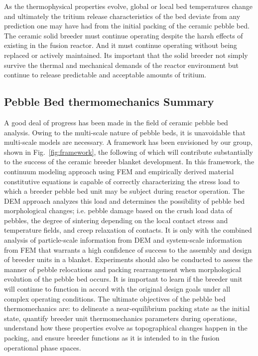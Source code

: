 As the thermophysical properties evolve, global or local bed temperatures change and ultimately the tritium release characteristics of the bed deviate from any prediction one may have had from the initial packing of the ceramic pebble bed. The ceramic solid breeder must continue operating despite the harsh effects of existing in the fusion reactor. And it must continue operating without being replaced or actively maintained. Its important that the solid breeder not simply survive the thermal and mechanical demands of the reactor environment but continue to release predictable and acceptable amounts of tritium. 

\subsection{Pebble Bed thermomechanics Summary}
A good deal of progress has been made in the field of ceramic pebble bed analysis. Owing to the multi-scale nature of pebble beds, it is unavoidable that multi-scale models are necessary. A framework has been envisioned by our group, shown in Fig.~\ref{fig:framework}, the following of which will contribute substantially to the success of the ceramic breeder blanket development. In this framework, the continuum modeling approach using FEM and empirically derived material constitutive equations is capable of correctly characterizing the stress load to which a breeder pebble bed unit may be subject during reactor operation. The DEM approach analyzes this load and determines the possibility of pebble bed morphological changes; i.e. pebble damage based on the crush load data of pebbles, the degree of sintering depending on the local contact stress and temperature fields, and creep relaxation of contacts. It is only with the combined analysis of particle-scale information from DEM and system-scale information from FEM that warrants a high confidence of success to the assembly and design of breeder units in a blanket.  Experiments should also be conducted to assess the manner of pebble relocations and packing rearrangement when morphological evolution of the pebble bed occurs. It is important to learn if the breeder unit will continue to function in accord with the original design goals under all complex operating conditions.  The ultimate objectives of the pebble bed thermomechanics are: to delineate a near-equilibrium packing state as the initial state, quantify breeder unit thermomechanics parameters during operations, understand how these properties evolve as topographical changes happen in the packing, and ensure breeder functions as it is intended to in the fusion operational phase spaces.

